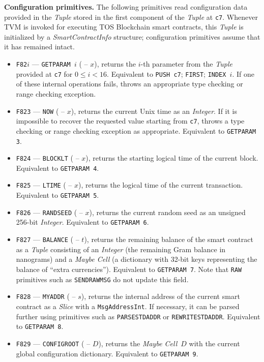 \documentclass[12pt,oneside]{article}
\def\makepoint#1{\medbreak\noindent{\bf #1.\ }}
\def\nxsubpoint{\refstepcounter{subsubsection}%
  \smallbreak\makepoint{\thesubsubsection}}
\def\emb#1{\textbf{#1.}}
\begin{document}
\nxsubpoint\emb{Configuration primitives}\label{sp:prim.conf.param}
The following primitives read configuration data provided in the {\em Tuple\/} stored in the first component of the {\em Tuple\/} at {\tt c7}. Whenever TVM is invoked for executing TOS Blockchain smart contracts, this {\em Tuple\/} is initialized by a {\em SmartContractInfo\/} structure; configuration primitives assume that it has remained intact.
\begin{itemize}
\item {\tt F82$i$} --- {\tt GETPARAM $i$} ( -- $x$), returns the $i$-th parameter from the {\em Tuple\/} provided at {\tt c7} for $0\leq i<16$. Equivalent to {\tt PUSH c7}; {\tt FIRST}; {\tt INDEX $i$}. If one of these internal operations fails, throws an appropriate type checking or range checking exception.
\item {\tt F823} --- {\tt NOW} ( -- $x$), returns the current Unix time as an {\em Integer}. If it is impossible to recover the requested value starting from {\tt c7}, throws a type checking or range checking exception as appropriate. Equivalent to {\tt GETPARAM 3}.
\item {\tt F824} --- {\tt BLOCKLT} ( -- $x$), returns the starting logical time of the current block. Equivalent to {\tt GETPARAM 4}.
\item {\tt F825} --- {\tt LTIME} ( -- $x$), returns the logical time of the current transaction. Equivalent to {\tt GETPARAM 5}.
\item {\tt F826} --- {\tt RANDSEED} ( -- $x$), returns the current random seed as an unsigned 256-bit {\em Integer}. Equivalent to {\tt GETPARAM 6}.
\item {\tt F827} --- {\tt BALANCE} ( -- $t$), returns the remaining balance of the smart contract as a {\em Tuple\/} consisting of an {\em Integer} (the remaining Gram balance in nanograms) and a {\em Maybe Cell} (a dictionary with 32-bit keys representing the balance of ``extra currencies''). Equivalent to {\tt GETPARAM 7}. Note that {\tt RAW} primitives such as {\tt SENDRAWMSG} do not update this field.
\item {\tt F828} --- {\tt MYADDR} ( -- $s$), returns the internal address of the current smart contract as a {\em Slice\/} with a {\tt MsgAddressInt}. If necessary, it can be parsed further using primitives such as {\tt PARSESTDADDR} or {\tt REWRITESTDADDR}. Equivalent to {\tt GETPARAM 8}.
\item {\tt F829} --- {\tt CONFIGROOT} ( -- $D$), returns the {\em Maybe Cell\/}~$D$ with the current global configuration dictionary. Equivalent to {\tt GETPARAM 9}.

\end{itemize}
\end{document}
